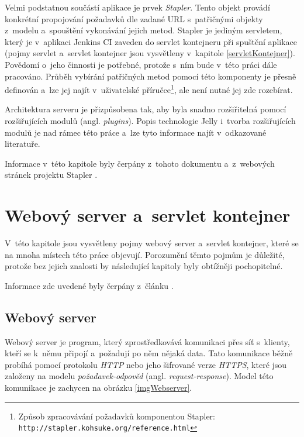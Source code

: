             Velmi podstatnou součástí aplikace je prvek \emph{Stapler}. Tento objekt
            provádí konkrétní propojování požadavků dle zadané URL s~patřičnými objekty
            z~modelu a~spouštění vykonávání jejich metod. Stapler je
            jediným servletem, který je v~aplikaci Jenkins CI zaveden do
            servlet kontejneru při spuštění aplikace (pojmy servlet a~servlet kontejner 
            jsou vysvětleny v~kapitole \ref{servletKontejner}).
            Povědomí o~jeho
            činnosti je potřebné, protože s~ním bude v~této práci dále pracováno.
            Průběh vybírání patřičných metod pomocí této komponenty je přesně
            definován a~lze jej najít v~uživatelské příručce\footnote{
                Způsob zpracovávání požadavků komponentou Stapler:
                \texttt{http://stapler.kohsuke.org/reference.html}}, 
                ale není nutné jej zde rozebírat.

            Architektura serveru je přizpůsobena tak, aby byla snadno rozšiřitelná
            pomocí rozšiřujících modulů (angl. \emph{plugins}). Popis technologie Jelly
            i~tvorba rozšiřujících modulů je nad rámec této práce a~lze tyto informace
            najít v~odkazované literatuře.
        
            Informace v~této kapitole byly čerpány z~tohoto dokumentu \cite{architectureOverview}
            a~z~webových stránek projektu Stapler \cite{staplerWeb}.

    \section{Webový server a~servlet kontejner} \label{servletWebserver}
        V~této kapitole jsou vysvětleny pojmy webový server a~servlet kontejner, které se 
        na mnoha místech této práce objevují. Porozumění těmto pojmům je důležité, protože bez
        jejich znalosti by následující kapitoly byly obtížněji pochopitelné.
        
        Informace zde uvedené byly čerpány z~článku \cite{webserverVsServletPage}.

        \subsection{Webový server}
            Webový server je program, který zprostředkovává komunikaci přes síť s~klienty, kteří
            se k~němu připojí a~požadují po něm nějaká data. Tato komunikace běžně probíhá pomocí protokolu \emph{HTTP}
            nebo jeho šifrované verze \emph{HTTPS},
            které jsou založeny na modelu \emph{požadavek-odpověd} (angl. \emph{request-response}).
            Model této komunikace je zachycen na obrázku \ref{imgWebserver}.
            

